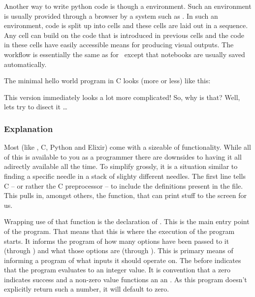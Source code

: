 Another way to write python code is though a  environment. Such an environment is usually provided through a browser by a system such as . In such an environment, code is split up into cells and these cells are laid out in a sequence. Any cell can build on the code that is introduced in previous cells and the code in these cells have easily accessible means for producing visual outputs. The workflow is essentially the same as for \csharp\ except that notebooks are usually saved automatically.


The minimal hello world program in C looks (more or less) like this:


This version immediately looks a lot more complicated! So, why is that? Well, lets try to disect it \ldots

\subsubsection{Explanation}

Most  (like \csharp, C, Python and Elixir) come with a sizeable  of functionality. While all of this is available to you as a programmer there are downsides to having it all adirectly available all the time. To simplify grossly, it is a situation similar to finding a specific needle in a stack of slighty different needles. The first line tells C -- or rather the C preprocessor -- to include the definitions present in the  file. This pulls in, amongst others, the  function, that can print stuff to the screen for us.

Wrapping use of that  function is the declaration of . This is the main entry point of the program. That means that this is where the execution of the program starts. It informs the program of how many options have been passed to it (through ) and what those options are (through ). This is  primary means of informing a program of what inputs it should operate on. The  before  indicates that the program evaluates to an integer value. It is convention that a zero indicates success and a non-zero value functions an an . As this program doesn't explicitly return such a number, it will default to zero.

